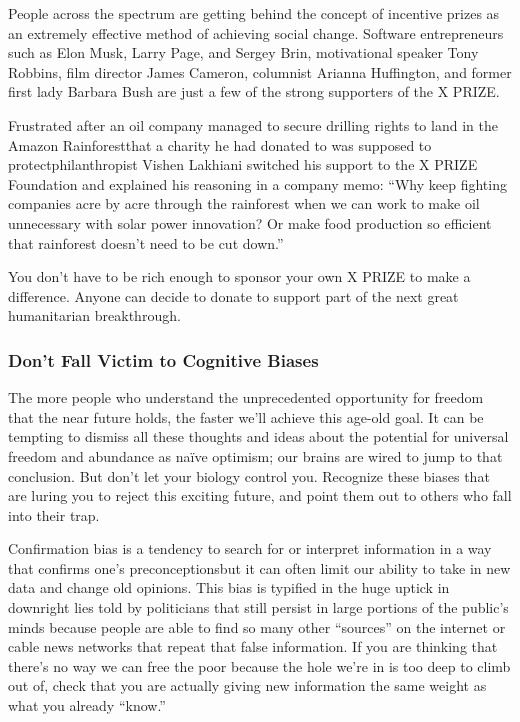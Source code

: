 {  People across the spectrum are getting behind the concept of incentive prizes
  as an extremely effective method of achieving social change. Software
  entrepreneurs such as Elon Musk, Larry Page, and Sergey Brin, motivational
  speaker Tony Robbins, film director James Cameron, columnist Arianna
  Huffington, and former first lady Barbara Bush are just a few of the strong
  supporters of the X PRIZE.

  \newReading Frustrated after an oil company managed to secure drilling rights
  to land in the Amazon Rainforest\textemdash{}that a charity he had donated to
  was supposed to protect\textemdash{}philanthropist Vishen Lakhiani switched
  his support to the X PRIZE Foundation and explained his reasoning in a company
  memo: ``Why keep fighting companies acre by acre through the rainforest when
  we can work to make oil unnecessary with solar power innovation? Or make food
  production so efficient that rainforest doesn't need to be cut down.''

  You don't have to be rich enough to sponsor your own X PRIZE to make a
  difference. Anyone can decide to donate to support part of the next great
  humanitarian breakthrough.

  \subsubsection*{Don't Fall Victim to Cognitive Biases}
  The more people who understand the unprecedented opportunity for freedom that
  the near future holds, the faster we'll achieve this age-old goal. It can be
  tempting to dismiss all these thoughts and ideas about the potential for
  universal freedom and abundance as na\"ive optimism; our brains are wired to
  jump to that conclusion. But don't let your biology control you. Recognize
  these biases that are luring you to reject this exciting future, and point
  them out to others who fall into their trap.

  Confirmation bias is a tendency to search for or interpret information in a
  way that confirms one's preconceptions\textemdash{}but it can often limit our
  ability to take in new data and change old opinions. This bias is typified in
  the huge uptick in downright lies told by politicians that still persist in
  large portions of the public's minds because people are able to find so many
  other ``sources'' on the internet or cable news networks that repeat that
  false information. If you are thinking that there's no way we can free the
  poor because the hole we're in is too deep to climb out of, check that you are
  actually giving new information the same weight as what you already ``know.''

}
